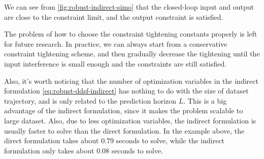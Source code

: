We can see from \cref{fig:robust-indirect-simo} that the closed-loop input and output are close to the constraint limit, and the output constraint is satisfied.


The problem of how to choose the constraint tightening constants properly is left for future research.
In practice, we can always start from a conservative constraint tightening scheme, and then gradually decrease the tightening until the input interference is small enough and the constraints are still satisfied.

Also, it's worth noticing that the number of optimization variables in the indirect formulation \cref{eq:robust-ddsf-indirect} has nothing to do with the size of dataset trajectory, and is only related to the prediction horizon $L$.
This is a big advantage of the indirect formulation, since it makes the problem scalable to large dataset.
Also, due to less optimization variables, the indirect formulation is usually faster to solve than the direct formulation.
In the example above, the direct formulation takes about $0.79$ seconds to solve, while the indirect formulation only takes about $0.08$ seconds to solve.
